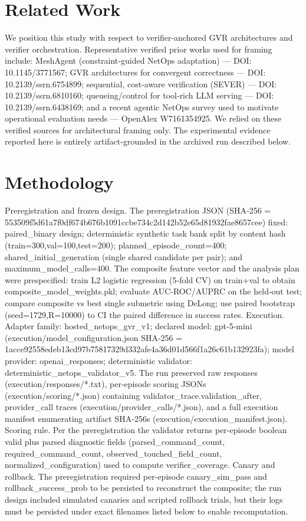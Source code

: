 \documentclass[conference]{IEEEtran}
\begin{document}
\section{Related Work}
We position this study with respect to verifier‑anchored GVR architectures and verifier orchestration. Representative verified prior works used for framing include: MeshAgent (constraint‑guided NetOps adaptation) --- DOI: 10.1145/3771567; GVR architectures for convergent correctness --- DOI: 10.2139/ssrn.6754899; sequential, cost‑aware verification (SEVER) --- DOI: 10.2139/ssrn.6810160; queueing/control for tool‑rich LLM serving --- DOI: 10.2139/ssrn.6438169; and a recent agentic NetOps survey used to motivate operational evaluation needs --- OpenAlex W7161354925. We relied on these verified sources for architectural framing only. The experimental evidence reported here is entirely artifact‑grounded in the archived run described below.

\section{Methodology}
Preregistration and frozen design. The preregistration JSON (SHA‑256 = 553509f5d61a7f0df674b676b1091ccbe734c2d142b52e65d81932fae8657cee) fixed: paired\_binary design; deterministic synthetic task bank split by content hash (train=300,val=100,test=200); planned\_episode\_count=400; shared\_initial\_generation (single shared candidate per pair); and maximum\_model\_calls=400. The composite feature vector and the analysis plan were prespecified: train L2 logistic regression (5‑fold CV) on train+val to obtain composite\_model\_weights.pkl; evaluate AUC‑ROC/AUPRC on the held‑out test; compare composite vs best single submetric using DeLong; use paired bootstrap (seed=1729,R=10000) to CI the paired difference in success rates. Execution. Adapter family: hosted\_netops\_gvr\_v1; declared model: gpt-5-mini (execution/model\_configuration.json SHA‑256 = 1acce92558edeb13cd97b75817329d332afe4a36d01d566f1a26c61b132923fa); model provider: openai\_responses; deterministic validator: deterministic\_netops\_validator\_v5. The run preserved raw responses (execution/responses/*.txt), per‑episode scoring JSONs (execution/scoring/*.json) containing validator\_trace.validation\_after, provider\_call traces (execution/provider\_calls/*.json), and a full execution manifest enumerating artifact SHA‑256s (execution/execution\_manifest.json). Scoring rule. Per the preregistration the validator returns per‑episode boolean valid plus parsed diagnostic fields (parsed\_command\_count, required\_command\_count, observed\_touched\_field\_count, normalized\_configuration) used to compute verifier\_coverage. Canary and rollback. The preregistration required per‑episode canary\_sim\_pass and rollback\_success\_prob to be persisted to reconstruct the composite; the run design included simulated canaries and scripted rollback trials, but their logs must be persisted under exact filenames listed below to enable recomputation.
\end{document}
